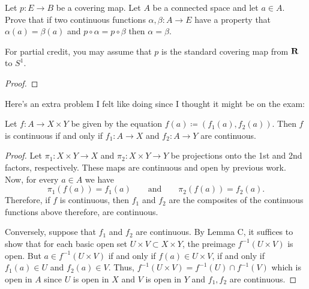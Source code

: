 \begin{problem}
Let $p\colon E\to B$ be a covering map. Let $A$ be a connected space and
let $a\in A$. Prove that if two continuous functions $\alpha,\beta\colon
A\to E$ have a property that $\alpha(a)=\beta(a)$ and
$p\circ\alpha=p\circ\beta$ then $\alpha=\beta$.

For partial credit, you may assume that $p$ is the standard covering map
from $\mathbf{R}$ to $S^1$.
\end{problem}
\begin{proof}
\end{proof}

Here's an extra problem I felt like doing since I thought it might be on
the exam:
\begin{problem*}
\begin{theorem*}
Let $f\colon A\to X\times Y$ be given by the equation
$f(a)\coloneqq(f_1(a),f_2(a))$. Then $f$ is continuous if and only if
$f_1\colon A\to X$ and $f_2\colon A\to Y$ are continuous.
\end{theorem*}
\end{problem*}
\begin{proof}
Let $\pi_1\colon X\times Y\to X$ and $\pi_2\colon X\times Y\to Y$ be
projections onto the 1st and 2nd factors, respectively. These maps are
continuous and open by previous work. Now, for every $a\in A$ we have
\[
\pi_1(f(a))=f_1(a)\qquad\text{and}\qquad
\pi_2(f(a))=f_2(a).
\]
Therefore, if $f$ is continuous, then $f_1$ and $f_2$ are the composites of
the continuous functions above therefore, are continuous.

Conversely, suppose that $f_1$ and $f_2$ are continuous. By Lemma C, it
suffices to show that for each basic open set $U\times V\subset X\times Y$,
the preimage $f^{-1}(U\times V)$ is open. But $a\in f^{-1}(U\times V)$ if
and only if $f(a)\in U\times V$, if and only if $f_1(a)\in U$ and
$f_2(a)\in V$. Thus, $f^{-1}(U\times V)=f^{-1}(U)\cap f^{-1}(V)$ which is
open in $A$ since $U$ is open in $X$ and $V$ is open in $Y$ and $f_1,f_2$
are continuous.
\end{proof}

